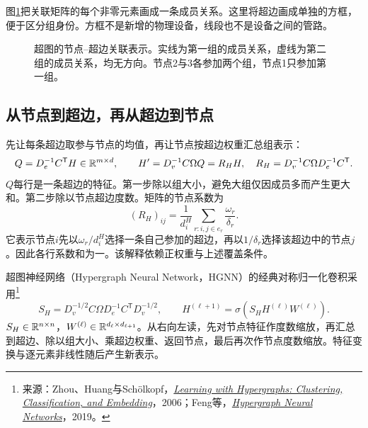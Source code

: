 图\ref{fig:graph-hyper-incidence-picture}把关联矩阵的每个非零元素画成一条成员关系。这里将超边画成单独的方框，便于区分组身份。方框不是新增的物理设备，线段也不是设备之间的管路。
\begin{figure}[htbp]
\centering
{}
\caption{超图的节点--超边关联表示。实线为第一组的成员关系，虚线为第二组的成员关系，均无方向。节点2与3各参加两个组，节点1只参加第一组。}
\label{fig:graph-hyper-incidence-picture}
\end{figure}

\subsection{从节点到超边，再从超边到节点}
先让每条超边取参与节点的均值，再让节点按超边权重汇总组表示：
\begin{equation}
 Q=D_e^{-1}C^{\mathsf T}H\in\mathbb{R}^{m\times d},\qquad
 H'=D_v^{-1}C\Omega Q=R_HH,
 \quad R_H=D_v^{-1}C\Omega D_e^{-1}C^{\mathsf T}.
 \label{eq:graph-hyper-random-walk}
\end{equation}
$Q$每行是一条超边的特征。第一步除以组大小，避免大组仅因成员多而产生更大和。第二步除以节点超边度数。矩阵的节点系数为
\begin{equation}
 (R_H)_{ij}=\frac1{d_i^H}\sum_{r:i,j\in e_r}\frac{\omega_r}{\delta_r}.
\end{equation}
它表示节点$i$先以$\omega_r/d_i^H$选择一条自己参加的超边，再以$1/\delta_r$选择该超边中的节点$j$。因此各行系数和为一。该解释依赖正权重与上述覆盖条件。

超图神经网络（Hypergraph Neural Network，HGNN）的经典对称归一化卷积采用\footnote{来源：Zhou、Huang与Sch\"olkopf，\href{https://proceedings.neurips.cc/paper_files/paper/2006/hash/dff8e9c2ac33381546d96deea9922999-Abstract.html}{\textit{Learning with Hypergraphs: Clustering, Classification, and Embedding}}，2006；Feng等，\href{https://arxiv.org/abs/1809.09401}{\textit{Hypergraph Neural Networks}}，2019。}
\begin{equation}
 S_H=D_v^{-1/2}C\Omega D_e^{-1}C^{\mathsf T}D_v^{-1/2},\qquad
 H^{(\ell+1)}=\sigma\!\left(S_HH^{(\ell)}W^{(\ell)}\right).
 \label{eq:graph-hyper-convolution}
\end{equation}
$S_H\in\mathbb{R}^{n\times n}$，$W^{(\ell)}\in\mathbb{R}^{d_\ell\times d_{\ell+1}}$。从右向左读，先对节点特征作度数缩放，再汇总到超边、除以组大小、乘超边权重、返回节点，最后再次作节点度数缩放。特征变换与逐元素非线性随后产生新表示。

